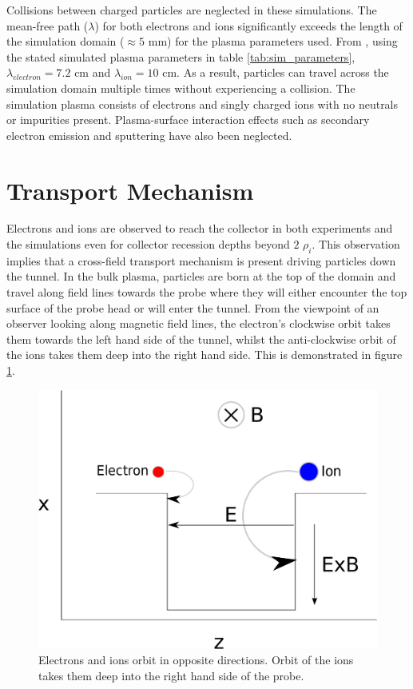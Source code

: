 Collisions between charged particles are neglected in these simulations. The mean-free path ($\lambda$) for both electrons and ions significantly exceeds the length of the simulation domain ($\approx 5$ mm) for the plasma parameters used. From  \cite{Wesson}, using the stated simulated plasma parameters in table \ref{tab:sim_parameters}, $\lambda_{electron} = 7.2$ cm and $\lambda_{ion} = 10$ cm.  As a result, particles can travel across the simulation domain multiple times without experiencing a collision. The simulation plasma consists of electrons and singly charged ions with no neutrals or impurities present. Plasma-surface interaction effects such as secondary electron emission and sputtering have also been neglected.



\section{Transport Mechanism}  \label{section:transport}
Electrons and ions are observed to reach the collector in both experiments \cite{BPP} and the simulations even for collector recession depths beyond $2$ $\rho_i$. This observation implies that a cross-field transport mechanism is present driving particles down the tunnel. In the bulk plasma, particles are born at the top of the domain and travel along field lines towards the probe where they will either encounter the top surface of the probe head or will enter the tunnel. From the viewpoint of an observer looking along  magnetic field lines, the electron's clockwise orbit takes them towards the left hand side of the tunnel, whilst the anti-clockwise orbit of the ions takes them deep into the right hand side. This is demonstrated in figure \ref{fig:orbits}.
\begin{figure}
	\begin{center}
		\includegraphics[width=.45\textwidth]{orbits.pdf}
		\caption{Electrons and ions orbit in opposite directions. Orbit of the ions takes them deep into the right hand side of the probe.}
		\label{fig:orbits}
	\end{center}
\end{figure}
